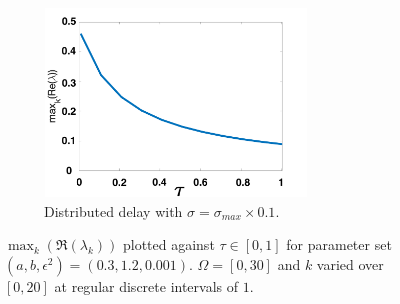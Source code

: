 \documentclass[12pt]{report}
\begin{document}
\begin{figure}[H]
\begin{subfigure}[b]{0.45\textwidth}
        \centering
        \includegraphics[width=7cm,height=5cm]{p1sigmax10.png}
        \caption{Distributed delay with $\sigma=\sigma_{max}\times0.1$.}
        \label{}
    \end{subfigure}
    \caption{$\max_k(\Re(\lambda_k))$ plotted against $\tau\in[0,1]$ for parameter set $(a,b,\epsilon^2)=(0.3,1.2,0.001)$. $\Omega=[0,30]$ and $k$ varied over $[0,20]$ at regular discrete intervals of $1$.}
    \label{fig:p1}
\end{figure}
\end{document}
